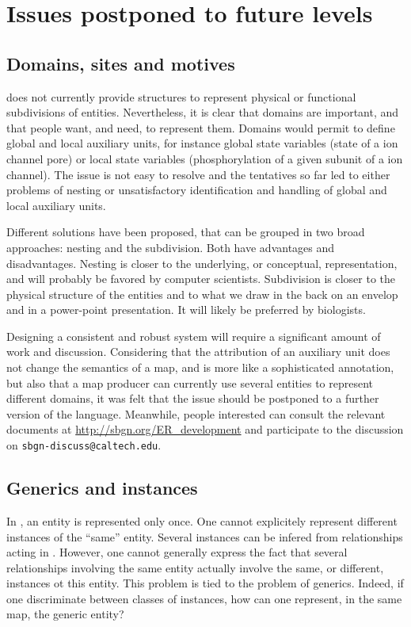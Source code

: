 \chapter{Issues postponed to future levels}\label{sec:postponed}

\section{Domains, sites and motives}\label{sec:unresolved_domain}

\SBGNERLone does not currently provide structures to represent physical or functional subdivisions of entities. Nevertheless, it is clear that domains are important, and that people want, and need, to represent them. 
Domains would permit to define global and local auxiliary units, for instance global state variables (state of a ion channel pore) or local state variables (phosphorylation of a given subunit of a ion channel). The issue is not easy to resolve and the tentatives so far led to either problems of nesting or unsatisfactory identification and handling of global and local auxiliary units. 

Different solutions have been proposed, that can be grouped in two broad approaches: nesting and the subdivision. Both have advantages and disadvantages. Nesting is closer to the underlying, or conceptual, representation, and will probably be favored by computer scientists. Subdivision is closer to the physical structure of the entities and to what we draw in the back on an envelop and in a power-point presentation. It will likely be preferred by biologists. 

Designing a consistent and robust system will require a significant amount of work and discussion. Considering that the attribution of an auxiliary unit does not change the semantics of a map, and is more like a sophisticated annotation, but also that a map producer can currently use several entities to represent different domains, it was felt that the issue should be postponed to a further version of the language. Meanwhile, people interested can consult the relevant documents at \url{http://sbgn.org/ER_development} and participate to the discussion on \texttt{sbgn-discuss@caltech.edu}.

\section{Generics and instances}\label{sec:instances}

In \SBGNERLone, an entity is represented only once. One cannot explicitely represent different instances of the ``same'' entity. Several instances can be infered from relationships acting in . However, one cannot generally express the fact that several relationships involving the same entity actually involve the same, or different, instances ot this entity. This problem is tied to the problem of generics. Indeed, if one discriminate between classes of instances, how can one represent, in the same map, the generic entity?